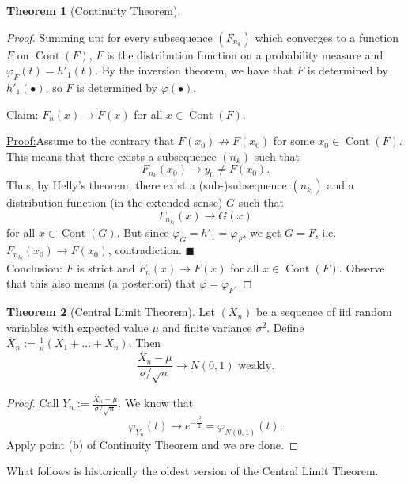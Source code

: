 \documentclass[12pt,a4paper]{report}
\theoremstyle{definition}
\newtheorem{theorem}{Theorem}[chapter] %
\theoremstyle{num.custom-title}
\newenvironment{claim}[1]{\par\noindent\underline{Claim#1:}\space}{} %
\newenvironment{claimproof}[1]{\par\noindent\underline{Proof:}\space#1}{\leavevmode\unskip\penalty9999 \hbox{}\nobreak\hfill\quad\hbox{$\blacksquare$}} %
\DeclareMathOperator{\Cont}{Cont}
\newcommand{\ol}{\overline}
\renewcommand{\phi}{\varphi}
\renewcommand{\1}{\mathbbm{1}}
\begin{document}
\begin{theorem}[Continuity Theorem]
\begin{proof}
Summing up: for every subsequence $(F_{n_k})$ which converges to a function $F$ on $\Cont(F)$, $F$ is the distribution function on a probability measure and $\phi_F(t) = h'_1(t)$. By the inversion theorem, we have that $F$ is determined by $h'_1(\bullet)$, so $F$ is determined by $\phi(\bullet)$.
\begin{claim}{}
$F_n(x) \to F(x)$ for all $x \in \Cont(F)$.
\begin{claimproof}
Assume to the contrary that $F(x_0) \not\to F(x_0)$ for some $x_0 \in \Cont(F)$. This means that there exists a subsequence $(n_k)$ such that
\[
F_{n_k}(x_0) \to y_0 \neq F(x_0).
\]
Thus, by Helly's theorem, there exist a (sub-)subsequence $(n_{k_l})$ and a distribution function (in the extended sense) $G$ such that
\[
F_{n_{k_l}}(x) \to G(x)
\]
for all $x \in \Cont(G)$. But since $\phi_G = h'_1 = \phi_F$, we get $G=F$, i.e. $F_{n_{k_l}}(x_0) \to F(x_0)$, contradiction.
\end{claimproof}
\end{claim}\\
Conclusion: $F$ is strict and $F_n(x) \to F(x)$ for all $x \in \Cont(F)$. Observe that this also means (a posteriori) that $\phi=\phi_F$.
\end{proof}
\end{theorem}

\begin{theorem}[Central Limit Theorem]
Let $(X_n)$ be a sequence of iid random variables with expected value $\mu$ and finite variance $\sigma^2$. Define $\ol{X}_n := \frac{1}{n} (X_1 + ... + X_n)$. Then
\[
\frac{\ol{X}_n - \mu}{\sigma/\sqrt{n}} \to N(0,1) \text{ weakly.}
\]
\begin{proof}
Call $Y_n := \frac{\ol{X}_n - \mu}{\sigma/\sqrt{n}}$. We know that
\[
\phi_{Y_n}(t) \to e^{-\frac{t^2}{2}} = \phi_{N(0,1)}(t).
\]
Apply point (b) of Continuity Theorem and we are done.
\end{proof}
\end{theorem}

What follows is historically the oldest version of the Central Limit Theorem.
\end{document}
